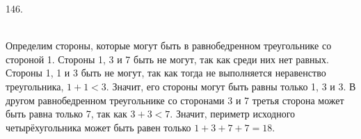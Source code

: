 146. \begin{figure}[ht!]
\end{figure}\\
Определим стороны, которые могут быть в равнобедренном треугольнике со стороной 1. Стороны 1, 3 и 7 быть не могут, так как среди них нет равных. Стороны 1, 1 и 3 быть не могут, так как тогда не выполняется неравенство треугольника,  $1+1<3.$ Значит, его стороны могут быть равны только 1, 3 и 3. В другом равнобедренном треугольнике со сторонами 3 и 7 третья сторона может быть равна только 7, так как $3+3<7.$ Значит, периметр исходного четырёхугольника может быть равен только $1+3+7+7=18.$\\
